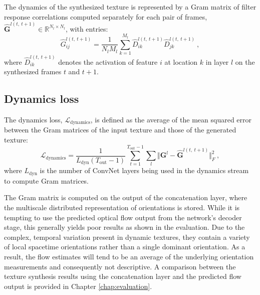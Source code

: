 The dynamics of the synthesized texture is represented
by a Gram matrix of filter response correlations 
computed separately for each pair of frames,
$\hat{\mathbf{G}}^{l(t,\ t+1)} \in \mathbb{R}^{N_l \times N_l}$,
with entries:
\begin{equation}
	\hat{G}_{ij}^{l(t,\ t+1)} = \frac{1}{N_l M_l} \sum_{k=1}^{M_l} \hat{D}_{ik}^{l(t,\ t+1)} \hat{D}_{jk}^{l(t,\ t+1)}\ ,	
\end{equation}
where $\hat{D}_{ik}^{l(t,\ t+1)}$ denotes the activation of feature $i$ at
location $k$ in layer $l$ on the synthesized frames $t$ and $t+1$.

\subsection{Dynamics loss}

The dynamics loss, $\mathcal{L}_\text{dynamics}$, is defined as
the average of the mean squared error between the Gram matrices
of the input texture
and those of the generated texture:
\begin{equation}
   \mathcal{L}_\text{dynamics} = \frac{1}{L_\text{dyn} (T_\text{out}-1)}\sum_{t=1}^{T_\text{out}-1} \sum_{l}  \Vert \mathbf{G}^l - \hat{\mathbf{G}}^{l(t,\ t+1)}\Vert^2_F\ , \label{eq:dynloss}
\end{equation}
where $L_\text{dyn}$ is the number of ConvNet layers being used
in the dynamics stream to compute Gram matrices.

The Gram matrix is computed on the output of the concatenation layer,
where the multiscale distributed representation of orientations is
stored. While it is tempting to use the predicted optical flow output from the
network's decoder stage, this generally yields poor results as shown in the evaluation.
Due to the complex, temporal variation present in dynamic
textures, they contain a variety of local spacetime
orientations rather than a single dominant orientation.
As a result, the flow estimates will tend to be an average of the
underlying  orientation measurements and consequently not
descriptive. A comparison between the texture synthesis results using the concatenation layer and the predicted flow output is provided in Chapter \ref{chap:evaluation}.

